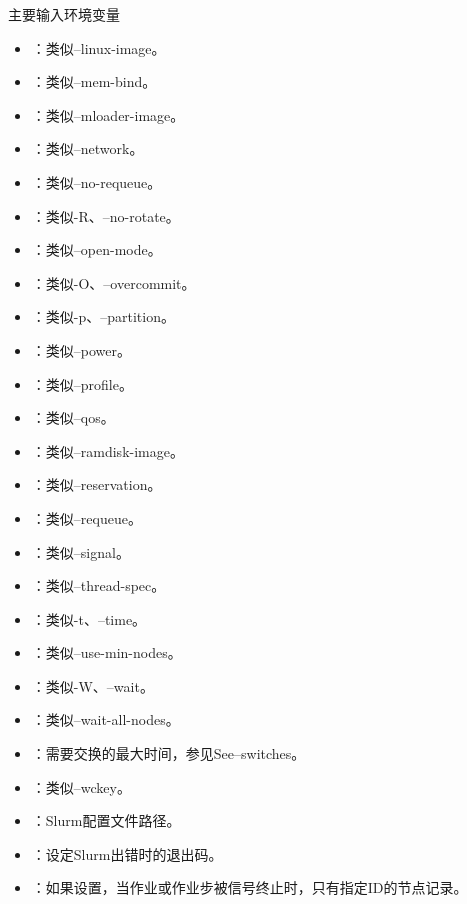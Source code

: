 \begin{frame}[fragile]{主要输入环境变量}
\begin{itemize}
	\item {}：类似--linux-image。
	\item {}：类似--mem-bind。
	\item {}：类似--mloader-image。
	\item {}：类似--network。
	\item {}：类似--no-requeue。
	\item {}：类似-R、--no-rotate。
	\item {}：类似--open-mode。
	\item {}：类似-O、--overcommit。
	\item {}：类似-p、--partition。
	\item {}：类似--power。
	\item {}：类似--profile。
	\item {}：类似--qos。
	\item {}：类似--ramdisk-image。
	\item {}：类似--reservation。
	\item {}：类似--requeue。
	\item {}：类似--signal。
	\item {}：类似--thread-spec。
	\item {}：类似-t、--time。
	\item {}：类似--use-min-nodes。
	\item {}：类似-W、--wait。
	\item {}：类似--wait-all-nodes。
	\item {}：需要交换的最大时间，参见See--switches。
	\item {}：类似--wckey。
	\item {}：Slurm配置文件路径。
	\item {}：设定Slurm出错时的退出码。
	\item {}：如果设置，当作业或作业步被信号终止时，只有指定ID的节点记录。
\end{itemize}
\end{frame}

